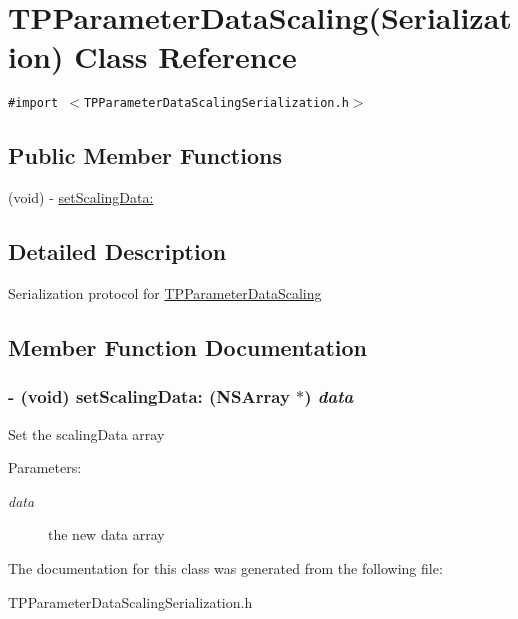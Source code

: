 \hypertarget{interface_t_p_parameter_data_scaling_07_serialization_08}{
\section{TPParameterDataScaling(Serialization) Class Reference}
\label{interface_t_p_parameter_data_scaling_07_serialization_08}
}
{\tt \#import $<$TPParameterDataScalingSerialization.h$>$}

\subsection*{Public Member Functions}
\begin{CompactItemize}
\item 
(void) - \hyperlink{interface_t_p_parameter_data_scaling_07_serialization_08_517a0240761209c835c4a395f649afe3}{setScalingData:}
\end{CompactItemize}


\subsection{Detailed Description}
Serialization protocol for \hyperlink{interface_t_p_parameter_data_scaling}{TPParameterDataScaling} 

\subsection{Member Function Documentation}
\hypertarget{interface_t_p_parameter_data_scaling_07_serialization_08_517a0240761209c835c4a395f649afe3}{
\subsubsection[{setScalingData:}]{\setlength{\rightskip}{0pt plus 5cm}- (void) setScalingData: (NSArray $\ast$) {\em data}}}
\label{interface_t_p_parameter_data_scaling_07_serialization_08_517a0240761209c835c4a395f649afe3}


Set the scalingData array \begin{Desc}
\item[Parameters:]
\begin{description}
\item[{\em data}]the new data array \end{description}
\end{Desc}


The documentation for this class was generated from the following file:\begin{CompactItemize}
\item 
TPParameterDataScalingSerialization.h\end{CompactItemize}
